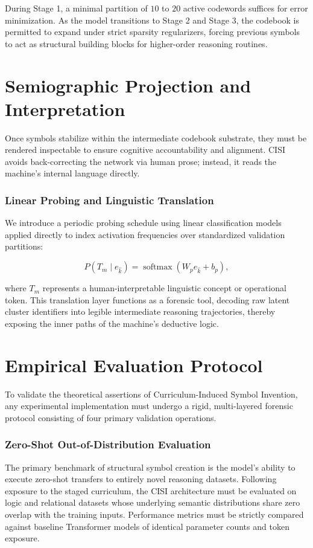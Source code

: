 During Stage 1, a minimal partition of $10$ to $20$ active codewords suffices for error minimization. As the model transitions to Stage 2 and Stage 3, the codebook is permitted to expand under strict sparsity regularizers, forcing previous symbols to act as structural building blocks for higher-order reasoning routines.

\chapter{Semiographic Projection and Interpretation}

Once symbols stabilize within the intermediate codebook substrate, they must be rendered inspectable to ensure cognitive accountability and alignment. CISI avoids back-correcting the network via human prose; instead, it reads the machine's internal language directly.

\subsection{Linear Probing and Linguistic Translation}
We introduce a periodic probing schedule using linear classification models applied directly to index activation frequencies over standardized validation partitions:

\begin{equation}
P(T_m \mid e_{\hat{k}}) = \operatorname{softmax}\left(W_p e_{\hat{k}} + b_p\right),
\end{equation}

where $T_m$ represents a human-interpretable linguistic concept or operational token. This translation layer functions as a forensic tool, decoding raw latent cluster identifiers into legible intermediate reasoning trajectories, thereby exposing the inner paths of the machine's deductive logic.

\chapter{Empirical Evaluation Protocol}

To validate the theoretical assertions of Curriculum-Induced Symbol Invention, any experimental implementation must undergo a rigid, multi-layered forensic protocol consisting of four primary validation operations.

\subsection{Zero-Shot Out-of-Distribution Evaluation}
The primary benchmark of structural symbol creation is the model's ability to execute zero-shot transfers to entirely novel reasoning datasets. Following exposure to the staged curriculum, the CISI architecture must be evaluated on logic and relational datasets whose underlying semantic distributions share zero overlap with the training inputs. Performance metrics must be strictly compared against baseline Transformer models of identical parameter counts and token exposure.

